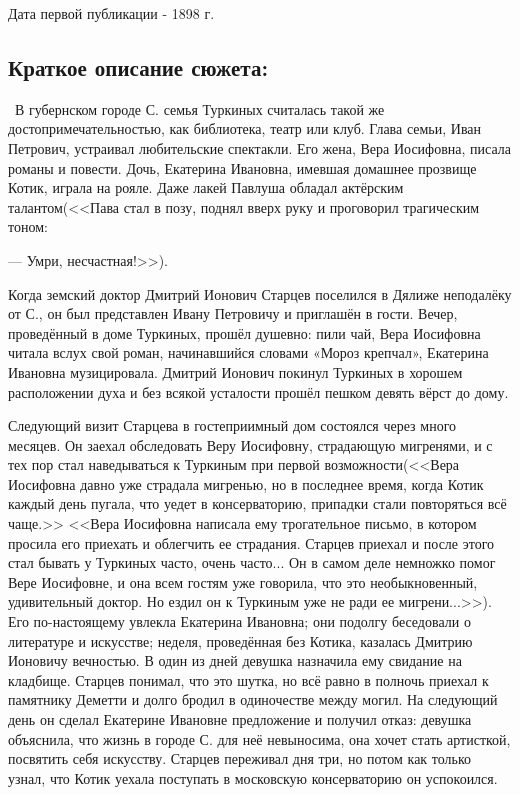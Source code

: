 \documentclass[a4paper,12pt]{article}
\begin{document}
	\noindent
	Дата первой публикации - 1898 г.
	
	\subsection{Краткое описание сюжета: }
	\quad \, В губернском городе С. семья Туркиных считалась такой же достопримечательностью, как библиотека, театр или клуб. Глава семьи, Иван Петрович, устраивал любительские спектакли. Его жена, Вера Иосифовна, писала романы и повести. Дочь, Екатерина Ивановна, имевшая домашнее прозвище Котик, играла на рояле. Даже лакей Павлуша обладал актёрским талантом(<<Пава стал в позу, поднял вверх руку и проговорил трагическим тоном:
	
	 — Умри, несчастная!>>).
	
	Когда земский доктор Дмитрий Ионович Старцев поселился в Дялиже неподалёку от С., он был представлен Ивану Петровичу и приглашён в гости. Вечер, проведённый в доме Туркиных, прошёл душевно: пили чай, Вера Иосифовна читала вслух свой роман, начинавшийся словами «Мороз крепчал», Екатерина Ивановна музицировала. Дмитрий Ионович покинул Туркиных в хорошем расположении духа и без всякой усталости прошёл пешком девять вёрст до дому.
	
	Следующий визит Старцева в гостеприимный дом состоялся через много месяцев. Он заехал обследовать Веру Иосифовну, страдающую мигренями, и с тех пор стал наведываться к Туркиным при первой возможности(<<Вера Иосифовна давно уже страдала мигренью, но в последнее время, когда Котик каждый день пугала, что уедет в консерваторию, припадки стали повторяться всё чаще.>> <<Вера Иосифовна написала ему трогательное письмо, в котором просила его приехать и облегчить ее страдания. Старцев приехал и после этого стал бывать у Туркиных часто, очень часто... Он в самом деле немножко помог Вере Иосифовне, и она всем гостям уже говорила, что это необыкновенный, удивительный доктор. Но ездил он к Туркиным уже не ради ее мигрени...>>). Его по-настоящему увлекла Екатерина Ивановна; они подолгу беседовали о литературе и искусстве; неделя, проведённая без Котика, казалась Дмитрию Ионовичу вечностью. В один из дней девушка назначила ему свидание на кладбище. Старцев понимал, что это шутка, но всё равно в полночь приехал к памятнику Деметти и долго бродил в одиночестве между могил. На следующий день он сделал Екатерине Ивановне предложение и получил отказ: девушка объяснила, что жизнь в городе С. для неё невыносима, она хочет стать артисткой, посвятить себя искусству. Старцев переживал дня три, но потом как только узнал, что Котик уехала поступать в московскую консерваторию он успокоился.
	
\end{document}
